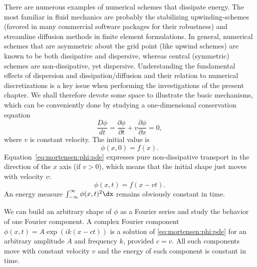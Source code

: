 There are numerous examples of numerical schemes that dissipate
energy. The most familiar in fluid mechanics are probably the stabilizing
upwinding-schemes (favored in many commercial software packages for
their robustness) and streamline diffusion methods in finite element
formulations. In general, numerical schemes that are asymmetric about
the grid point (like upwind schemes) are known to be both dissipative
and dispersive, whereas central (symmetric) schemes are non-dissipative,
yet dispersive. Understanding the fundamental effects of dispersion and
dissipation/diffusion and their relation to numerical discretizations is
a key issue when performing the investigations of the present chapter. We
shall therefore devote some space to illustrate the basic mechanisms,
which can be conveniently done by studying a one-dimensional conservation
equation
\begin{equation}
\frac{D\phi}{dt}
 = \frac{\partial\phi}{\partial t} + v\frac{\partial\phi}{\partial x}
  = 0,
\label{eq:mortensen:phi:pde}
\end{equation}
where $v$ is constant velocity. The initial value is
\begin{equation}
  \phi(x,0)=f(x).
\end{equation}
Equation~\eqref{eq:mortensen:phi:pde} expresses pure non-dissipative transport
in the direction of the $x$ axis (if $v>0$), which means that the initial
shape just moves with velocity $v$:
\begin{equation}
 \phi(x,t) = f(x-vt).
\end{equation}
An energy measure $\int_{-\infty}^\infty\phi(x,t)^2\dx$ remains
obviously constant in time.

We can build an arbitrary shape of $\phi$ as a Fourier series and
study the behavior of one Fourier component.  A complex Fourier
component $\phi (x,t)=A\exp{(ik(x - ct))}$ is a solution of
\eqref{eq:mortensen:phi:pde} for an arbitrary amplitude $A$ and
frequency $k$, provided $c = v$.  All such components move with
constant velocity $v$ and the energy of each component is constant in
time.

